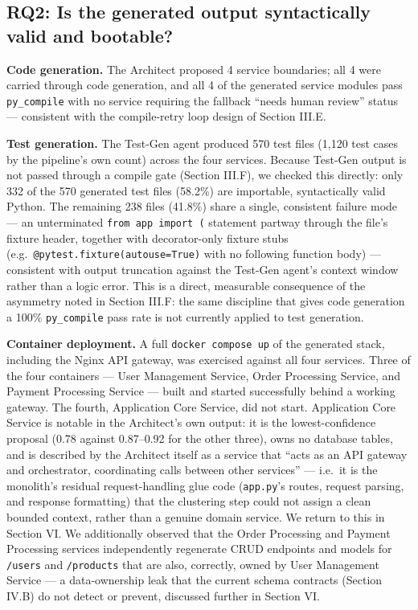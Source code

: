 \documentclass[conference]{IEEEtran}
\begin{document}
\subsection{RQ2: Is the generated output syntactically valid and bootable?}

\textbf{Code generation.} The Architect proposed 4 service boundaries; all 4 were carried through code generation, and all 4 of the generated service modules pass \texttt{py\_compile} with no service requiring the fallback ``needs human review'' status --- consistent with the compile-retry loop design of Section III.E.

\textbf{Test generation.} The Test-Gen agent produced 570 test files (1,120 test cases by the pipeline's own count) across the four services. Because Test-Gen output is not passed through a compile gate (Section III.F), we checked this directly: only 332 of the 570 generated test files (58.2\%) are importable, syntactically valid Python. The remaining 238 files (41.8\%) share a single, consistent failure mode --- an unterminated \texttt{from app import (} statement partway through the file's fixture header, together with decorator-only fixture stubs (e.g.\ \texttt{@pytest.fixture(autouse=True)} with no following function body) --- consistent with output truncation against the Test-Gen agent's context window rather than a logic error. This is a direct, measurable consequence of the asymmetry noted in Section III.F: the same discipline that gives code generation a 100\% \texttt{py\_compile} pass rate is not currently applied to test generation.

\textbf{Container deployment.} A full \texttt{docker compose up} of the generated stack, including the Nginx API gateway, was exercised against all four services. Three of the four containers --- User Management Service, Order Processing Service, and Payment Processing Service --- built and started successfully behind a working gateway. The fourth, Application Core Service, did not start. Application Core Service is notable in the Architect's own output: it is the lowest-confidence proposal (0.78 against 0.87--0.92 for the other three), owns no database tables, and is described by the Architect itself as a service that ``acts as an API gateway and orchestrator, coordinating calls between other services'' --- i.e.\ it is the monolith's residual request-handling glue code (\texttt{app.py}'s routes, request parsing, and response formatting) that the clustering step could not assign a clean bounded context, rather than a genuine domain service. We return to this in Section VI. We additionally observed that the Order Processing and Payment Processing services independently regenerate CRUD endpoints and models for \texttt{/users} and \texttt{/products} that are also, correctly, owned by User Management Service --- a data-ownership leak that the current schema contracts (Section IV.B) do not detect or prevent, discussed further in Section VI.
\end{document}
